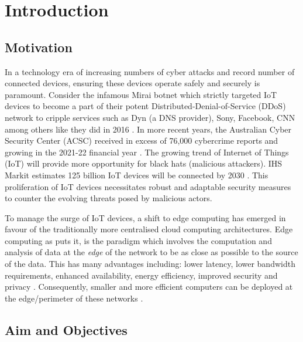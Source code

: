 \chapter[Introduction]{Introduction}
\label{Chap:Intro}



\section{Motivation}


In a technology era of increasing numbers of cyber attacks and record number of connected devices, ensuring these devices operate safely and securely is 
paramount. Consider the infamous Mirai botnet which strictly targeted IoT devices to become a part of their potent Distributed-Denial-of-Service (DDoS) network to cripple services such as Dyn (a DNS provider), Sony, Facebook, CNN among others like they did in 2016 \cite{Shapiro_2023}. In more recent years, the Australian Cyber Security Center (ACSC) received in excess of 76,000 cybercrime reports and growing in the 2021-22 financial year \cite{acsc_2022}. The growing trend of Internet of Things (IoT) will provide 
more opportunity for black hats (malicious attackers). IHS Markit estimates 125 billion IoT devices will be connected by 2030 \cite{IHS_iot}.
This proliferation of IoT devices necessitates robust and adaptable security measures to counter the evolving threats posed by malicious actors. 

To manage the surge of IoT devices, a shift to edge computing has emerged in favour of the traditionally more centralised cloud computing 
architectures. Edge computing as \cite{EdgeComputing} puts it, is the paradigm which involves the computation and analysis of data 
at the \textit{edge} of the network to be as close as possible to the source of the data. This has many advantages including: lower latency, lower bandwidth requirements,
enhanced availability, energy efficiency, improved security and privacy \cite{EdgeComputing}. Consequently, smaller and more efficient computers can be deployed 
at the edge/perimeter of these networks \cite{EdgeComputingPerspectives}. 



\section{Aim and Objectives}

